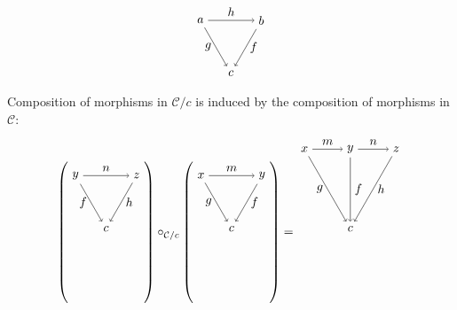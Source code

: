 \documentclass[10pt]{article}
\theoremstyle{definition}
\theoremstyle{remark}
\newcommand{\catC}{\mathcal{C}}
\begin{document}
\[
    \begin{tikzpicture}
        \draw (150:1) node(tl){$a$};
        \draw ( 30:1) node(tr){$b$};
        \draw (270:1)node(bm){$c$};

        \draw[->] (tl) to node[below,left ]{$g$} (bm);
        \draw[->] (tr) to node[below,right]{$f$} (bm);

        \draw[->] (tl) to node[above]{$h$} (tr);
    \end{tikzpicture}
\]
Composition of morphisms in $\catC/c$ is induced by the composition of morphisms in $\catC$:
\[
    \left(
    \begin{tikzpicture}
        \draw (150:1) node(tl){$y$};
        \draw ( 30:1) node(tr){$z$};
        \draw (270:1) node(bm){$c$};

        \draw[->] (tl) to node[below,left ]{$f$} (bm);
        \draw[->] (tr) to node[below,right]{$h$} (bm);

        \draw[->] (tl) to node[above]{$n$} (tr);
    \end{tikzpicture}
    \right)
    \circ_{\catC/c}
    \left(
    \begin{tikzpicture}
        \draw (150:1) node(tl){$x$};
        \draw ( 30:1) node(tr){$y$};
        \draw (270:1) node(bm){$c$};

        \draw[->] (tl) to node[below,left ]{$g$} (bm);
        \draw[->] (tr) to node[below,right]{$f$} (bm);

        \draw[->] (tl) to node[above]{$m$} (tr);
    \end{tikzpicture}
    \right)
    =
    \begin{tikzpicture}
        \draw (150:1.5) node(tl){$x$};
        \draw ( 90:0.75) node(tm){$y$};
        \draw ( 30:1.5) node(tr){$z$};
        \draw (270:1.5) node(bm){$c$};

        \draw[->] (tl) to node[below,left ]{$g$} (bm);
        \draw[->] (tm) to node[right]{$f$} (bm);
        \draw[->] (tr) to node[below,right]{$h$} (bm);

        \draw[->] (tl) to node[above]{$m$} (tm);
        \draw[->] (tm) to node[above]{$n$} (tr);
    \end{tikzpicture}
\]
\end{document}
